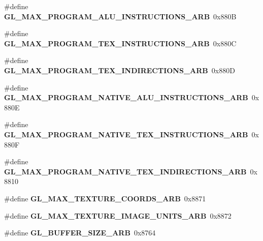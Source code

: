 \begin{DoxyCompactItemize}
\item 
\#define {\bfseries G\+L\+\_\+\+M\+A\+X\+\_\+\+P\+R\+O\+G\+R\+A\+M\+\_\+\+A\+L\+U\+\_\+\+I\+N\+S\+T\+R\+U\+C\+T\+I\+O\+N\+S\+\_\+\+A\+R\+B}~0x880\+B\label{_s_d_l__opengl_8h_a0a3844dfc5d6766d166fd16a83087849}

\item 
\#define {\bfseries G\+L\+\_\+\+M\+A\+X\+\_\+\+P\+R\+O\+G\+R\+A\+M\+\_\+\+T\+E\+X\+\_\+\+I\+N\+S\+T\+R\+U\+C\+T\+I\+O\+N\+S\+\_\+\+A\+R\+B}~0x880\+C\label{_s_d_l__opengl_8h_ae32ef20f92d41db853dfd36573b0da32}

\item 
\#define {\bfseries G\+L\+\_\+\+M\+A\+X\+\_\+\+P\+R\+O\+G\+R\+A\+M\+\_\+\+T\+E\+X\+\_\+\+I\+N\+D\+I\+R\+E\+C\+T\+I\+O\+N\+S\+\_\+\+A\+R\+B}~0x880\+D\label{_s_d_l__opengl_8h_a72488af52d9f9004695aef4da465afd4}

\item 
\#define {\bfseries G\+L\+\_\+\+M\+A\+X\+\_\+\+P\+R\+O\+G\+R\+A\+M\+\_\+\+N\+A\+T\+I\+V\+E\+\_\+\+A\+L\+U\+\_\+\+I\+N\+S\+T\+R\+U\+C\+T\+I\+O\+N\+S\+\_\+\+A\+R\+B}~0x880\+E\label{_s_d_l__opengl_8h_a18976e75636a5d28a5e1e2cfa3477e27}

\item 
\#define {\bfseries G\+L\+\_\+\+M\+A\+X\+\_\+\+P\+R\+O\+G\+R\+A\+M\+\_\+\+N\+A\+T\+I\+V\+E\+\_\+\+T\+E\+X\+\_\+\+I\+N\+S\+T\+R\+U\+C\+T\+I\+O\+N\+S\+\_\+\+A\+R\+B}~0x880\+F\label{_s_d_l__opengl_8h_a486c49ecd3ccd7817239b714e23d2fcb}

\item 
\#define {\bfseries G\+L\+\_\+\+M\+A\+X\+\_\+\+P\+R\+O\+G\+R\+A\+M\+\_\+\+N\+A\+T\+I\+V\+E\+\_\+\+T\+E\+X\+\_\+\+I\+N\+D\+I\+R\+E\+C\+T\+I\+O\+N\+S\+\_\+\+A\+R\+B}~0x8810\label{_s_d_l__opengl_8h_a2be0f0ad505c7415604be985b6add29c}

\item 
\#define {\bfseries G\+L\+\_\+\+M\+A\+X\+\_\+\+T\+E\+X\+T\+U\+R\+E\+\_\+\+C\+O\+O\+R\+D\+S\+\_\+\+A\+R\+B}~0x8871\label{_s_d_l__opengl_8h_a8a43e31ad6ecfc7e840dd80cc44438b7}

\item 
\#define {\bfseries G\+L\+\_\+\+M\+A\+X\+\_\+\+T\+E\+X\+T\+U\+R\+E\+\_\+\+I\+M\+A\+G\+E\+\_\+\+U\+N\+I\+T\+S\+\_\+\+A\+R\+B}~0x8872\label{_s_d_l__opengl_8h_a4b1b083176bc9e9fc132692f589d3436}

\item 
\#define {\bfseries G\+L\+\_\+\+B\+U\+F\+F\+E\+R\+\_\+\+S\+I\+Z\+E\+\_\+\+A\+R\+B}~0x8764\label{_s_d_l__opengl_8h_a79b32a071af137fa59ca406e3e8254e7}


\end{DoxyCompactItemize}
